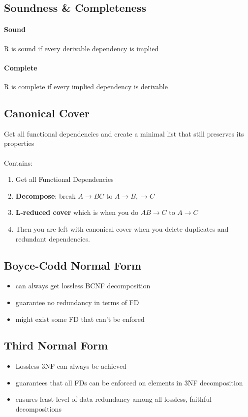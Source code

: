 \documentclass{article}
\newcommand\tab[1][0.5cm]{\hspace*{#1}}
\begin{document}
	\subsection{Soundness \& Completeness}
		\paragraph{Sound} R is sound if every derivable dependency is implied
		\paragraph{Complete} R is complete if every implied dependency is derivable

	\subsection{Canonical Cover}
		Get all functional dependencies and create a minimal list that still preserves its properties
		\\\\\tab Contains:
		\begin{enumerate}
			\item Get all Functional Dependencies
			\item \textbf{Decompose}: break $A \rightarrow BC$ to $A \rightarrow B,  \rightarrow C$
			\item \textbf{L-reduced cover} which is when you do $AB \rightarrow C$ to $A \rightarrow C$
			\item Then you are left with canonical cover when you delete duplicates and redundant dependencies.
		\end{enumerate}

	\subsection{Boyce-Codd Normal Form}
		\begin{itemize}
			\item can always get lossless BCNF decomposition
			\item guarantee no redundancy in terms of FD
			\item might exist some FD that can't be enfored
		\end{itemize}

	\subsection{Third Normal Form}
		\begin{itemize}
			\item Lossless 3NF can always be achieved
			\item guarantees that all FDs can be enforced on elements in 3NF decomposition
			\item ensures least level of data redundancy among all lossless, faithful decompositions
		\end{itemize}
\end{document}
